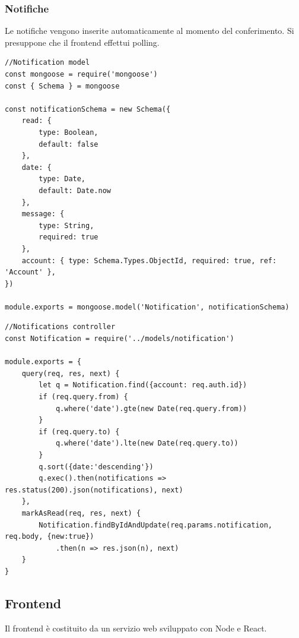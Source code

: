 \documentclass{report}
\begin{document}
\subsubsection{Notifiche}
Le notifiche vengono inserite automaticamente al momento del conferimento. Si presuppone che il frontend effettui polling.
\begin{lstlisting}
//Notification model
const mongoose = require('mongoose')
const { Schema } = mongoose

const notificationSchema = new Schema({
    read: {
        type: Boolean,
        default: false
    },
    date: {
        type: Date,
        default: Date.now
    },
    message: {
        type: String,
        required: true
    },
    account: { type: Schema.Types.ObjectId, required: true, ref: 'Account' },
})

module.exports = mongoose.model('Notification', notificationSchema)
\end{lstlisting}

\begin{lstlisting}
//Notifications controller
const Notification = require('../models/notification')

module.exports = {
    query(req, res, next) {
        let q = Notification.find({account: req.auth.id})
        if (req.query.from) {
            q.where('date').gte(new Date(req.query.from))
        }
        if (req.query.to) {
            q.where('date').lte(new Date(req.query.to))
        }
        q.sort({date:'descending'})
        q.exec().then(notifications => res.status(200).json(notifications), next)
    },
    markAsRead(req, res, next) {
        Notification.findByIdAndUpdate(req.params.notification, req.body, {new:true})
            .then(n => res.json(n), next)
    }
}
\end{lstlisting}

\subsection{Frontend}
Il frontend è costituito da un servizio web sviluppato con Node e React.
\end{document}
